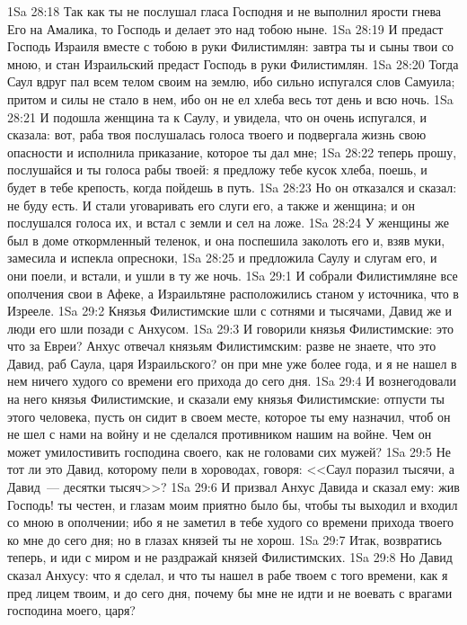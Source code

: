 \vs 1Sa 28:18 Так как ты не послушал гласа Господня и не выполнил ярости гнева Его на Амалика, то Господь и делает это над тобою ныне.
\vs 1Sa 28:19 И предаст Господь Израиля вместе с тобою в руки Филистимлян: завтра ты и сыны твои  со мною, и стан Израильский предаст Господь в руки Филистимлян.
\vs 1Sa 28:20 Тогда Саул вдруг пал всем телом своим на землю, ибо сильно испугался слов Самуила; притом и силы не стало в нем, ибо он не ел хлеба весь тот день и всю ночь.
\vs 1Sa 28:21 И подошла женщина та к Саулу, и увидела, что он очень испугался, и сказала: вот, раба твоя послушалась голоса твоего и подвергала жизнь свою опасности и исполнила приказание, которое ты дал мне;
\vs 1Sa 28:22 теперь прошу, послушайся и ты голоса рабы твоей: я предложу тебе кусок хлеба, поешь, и будет в тебе крепость, когда пойдешь в путь.
\vs 1Sa 28:23 Но он отказался и сказал: не буду есть. И стали уговаривать его слуги его, а также и женщина; и он послушался голоса их, и встал с земли и сел на ложе.
\vs 1Sa 28:24 У женщины же был в доме откормленный теленок, и она поспешила заколоть его и, взяв муки, замесила и испекла опресноки,
\vs 1Sa 28:25 и предложила Саулу и слугам его, и они поели, и встали, и ушли в ту же ночь.
\vs 1Sa 29:1 И собрали Филистимляне все ополчения свои в Афеке, а Израильтяне расположились станом у источника, что в Изрееле.
\vs 1Sa 29:2 Князья Филистимские шли с сотнями и тысячами, Давид же и люди его шли позади с Анхусом.
\vs 1Sa 29:3 И говорили князья Филистимские: это что за Евреи? Анхус отвечал князьям Филистимским: разве не знаете, что это Давид, раб Саула, царя Израильского? он при мне уже более года, и я не нашел в нем ничего худого со времени его прихода до сего дня.
\vs 1Sa 29:4 И вознегодовали на него князья Филистимские, и сказали ему князья Филистимские: отпусти ты этого человека, пусть он сидит в своем месте, которое ты ему назначил, чтоб он не шел с нами на войну и не сделался противником нашим на войне. Чем он может умилостивить господина своего, как не головами сих мужей?
\vs 1Sa 29:5 Не тот ли это Давид, которому пели в хороводах, говоря: <<Саул поразил тысячи, а Давид~--- десятки тысяч>>?
\vs 1Sa 29:6 И призвал Анхус Давида и сказал ему: жив Господь! ты честен, и глазам моим приятно было бы, чтобы ты выходил и входил со мною в ополчении; ибо я не заметил в тебе худого со времени прихода твоего ко мне до сего дня; но в глазах князей ты не хорош.
\vs 1Sa 29:7 Итак, возвратись теперь, и иди с миром и не раздражай князей Филистимских.
\vs 1Sa 29:8 Но Давид сказал Анхусу: что я сделал, и что ты нашел в рабе твоем с того времени, как я пред лицем твоим, и до сего дня, почему бы мне не идти и не воевать с врагами господина моего, царя?
